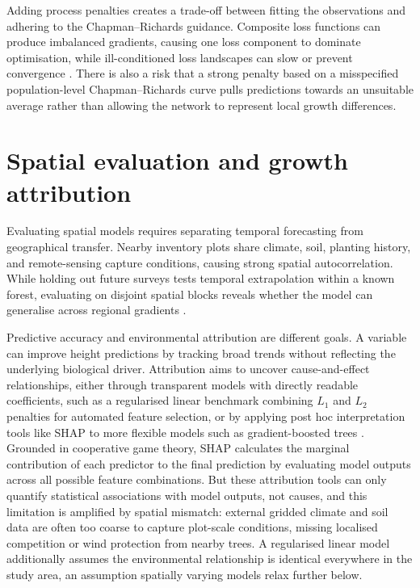 Adding process penalties creates a trade-off between fitting the observations and adhering to the Chapman--Richards guidance. Composite loss functions can produce imbalanced gradients, causing one loss component to dominate optimisation, while ill-conditioned loss landscapes can slow or prevent convergence \citep{wang2021Understanding_C4_NN,rathore2024Challenges_C4_NN}. There is also a risk that a strong penalty based on a misspecified population-level Chapman--Richards curve pulls predictions towards an unsuitable average rather than allowing the network to represent local growth differences.

\section{Spatial evaluation and growth attribution}
\label{sec:background-spatial-attribution}

Evaluating spatial models requires separating temporal forecasting from geographical transfer. Nearby inventory plots share climate, soil, planting history, and remote-sensing capture conditions, causing strong spatial autocorrelation. While holding out future surveys tests temporal extrapolation within a known forest, evaluating on disjoint spatial blocks reveals whether the model can generalise across regional gradients \citep{ploton2020Spatial_C5_EVAL}.

Predictive accuracy and environmental attribution are different goals. A variable can improve height predictions by tracking broad trends without reflecting the underlying biological driver. Attribution aims to uncover cause-and-effect relationships, either through transparent models with directly readable coefficients, such as a regularised linear benchmark combining $L_1$ and $L_2$ penalties for automated feature selection, or by applying post hoc interpretation tools like SHAP to more flexible models such as gradient-boosted trees \citep{lundberg2017Unified_C7_XAI}. Grounded in cooperative game theory, SHAP calculates the marginal contribution of each predictor to the final prediction by evaluating model outputs across all possible feature combinations. But these attribution tools can only quantify statistical associations with model outputs, not causes, and this limitation is amplified by spatial mismatch: external gridded climate and soil data are often too coarse to capture plot-scale conditions, missing localised competition or wind protection from nearby trees. A regularised linear model additionally assumes the environmental relationship is identical everywhere in the study area, an assumption spatially varying models relax further below.

